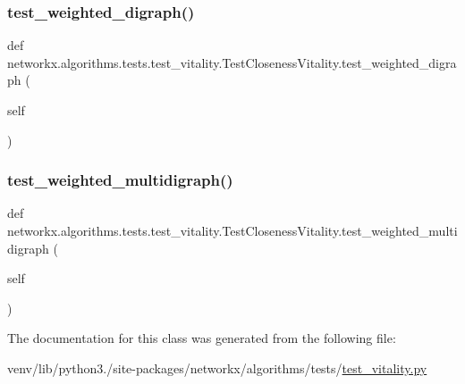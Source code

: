 \subsubsection{\texorpdfstring{test\+\_\+weighted\+\_\+digraph()}{test\_weighted\_digraph()}}
{\footnotesize\ttfamily def networkx.\+algorithms.\+tests.\+test\+\_\+vitality.\+Test\+Closeness\+Vitality.\+test\+\_\+weighted\+\_\+digraph (\begin{DoxyParamCaption}\item[{}]{self }\end{DoxyParamCaption})}

\mbox{\label{classnetworkx_1_1algorithms_1_1tests_1_1test__vitality_1_1TestClosenessVitality_a73bc5688141670e4e0d69d4340e555c4}} 
\subsubsection{\texorpdfstring{test\+\_\+weighted\+\_\+multidigraph()}{test\_weighted\_multidigraph()}}
{\footnotesize\ttfamily def networkx.\+algorithms.\+tests.\+test\+\_\+vitality.\+Test\+Closeness\+Vitality.\+test\+\_\+weighted\+\_\+multidigraph (\begin{DoxyParamCaption}\item[{}]{self }\end{DoxyParamCaption})}



The documentation for this class was generated from the following file\+:\begin{DoxyCompactItemize}
\item 
venv/lib/python3./site-\/packages/networkx/algorithms/tests/\hyperlink{test__vitality_8py}{test\+\_\+vitality.\+py}\end{DoxyCompactItemize}
